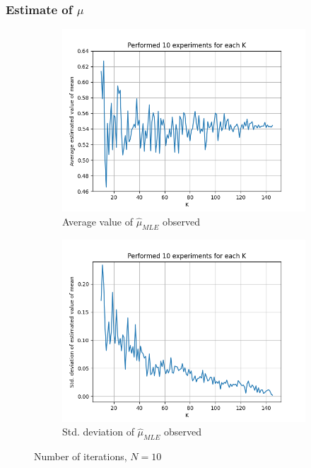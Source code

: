 \documentclass[fleqn, 11pt]{article}
\begin{document}
\subsubsection{Estimate of $\mu$}
\begin{figure}[H]
    \centering
    \begin{subfigure}[H]{0.49\textwidth}
        \centering
        \includegraphics[width=\textwidth]{P1/mu/avgs_10.png}
        \caption[]{Average value of $\hat{\mu}_{MLE}$ observed}
    \end{subfigure}
    \begin{subfigure}[H]{0.49\textwidth}
        \centering
        \includegraphics[width=\textwidth]{P1/mu/stds_10.png}
        \caption[]{Std. deviation of $\hat{\mu}_{MLE}$ observed}
    \end{subfigure}
    \caption{Number of iterations, $N = 10$}
\end{figure}
\end{document}

